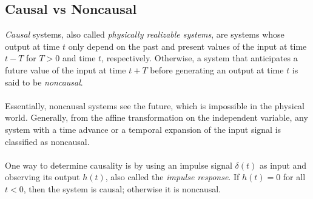 \documentclass{report}
\begin{document}
\subsection{Causal vs Noncausal}
\emph{Causal} systems, also called \emph{physically realizable systems}, are systems whose output at time $t$ only depend on the past and present values of the input at time $t-T$ for $T>0$ and time $t$, respectively. 
Otherwise, a system that anticipates a future value of the input at time $t+T$ before generating an output at time $t$ is said to be \emph{noncausal}. \\ \\
Essentially, noncausal systems see the future, which is impossible in the physical world. 
Generally, from the affine transformation on the independent variable, any system with a time advance or a temporal expansion of the input signal is classified as noncausal.
\\ \\
One way to determine causality is by using an impulse signal $\delta(t)$ as input and observing its output $h(t)$, also called the \emph{impulse response}. If $h(t)=0$ for all $t<0$, 
then the system is causal; otherwise it is noncausal.

\begin{center}
\end{center}
\end{document}
